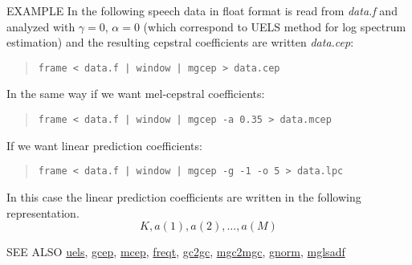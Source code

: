 \newpage
\begin{options}
\end{options}

\begin{qsection}{EXAMPLE}
In the following speech data in float format is read
from {\em data.f} and analyzed with $\gamma=0$, $\alpha=0$
(which correspond to UELS method for log spectrum estimation)
and the resulting cepstral coefficients are written {\em data.cep}:
\begin{quote}
  \verb!frame < data.f | window | mgcep > data.cep !
\end{quote}

In the same way if we want mel-cepstral coefficients:
\begin{quote}
 \verb!frame < data.f | window | mgcep -a 0.35 > data.mcep !
\end{quote}

If we want linear prediction coefficients:
\begin{quote}
  \verb!frame < data.f | window | mgcep -g -1 -o 5 > data.lpc !
\end{quote}
In this case the linear prediction coefficients are written
in the following representation.
\begin{displaymath}
  K, a(1), a(2), \dots, a(M)
\end{displaymath}
\end{qsection}

\begin{qsection}{SEE ALSO}
\hyperlink{uels}{uels},
\hyperlink{gcep}{gcep},
\hyperlink{mcep}{mcep},
\hyperlink{freqt}{freqt},
\hyperlink{gc2gc}{gc2gc},
\hyperlink{mgc2mgc}{mgc2mgc},
\hyperlink{gnorm}{gnorm},
\hyperlink{mglsadf}{mglsadf}
\end{qsection}
